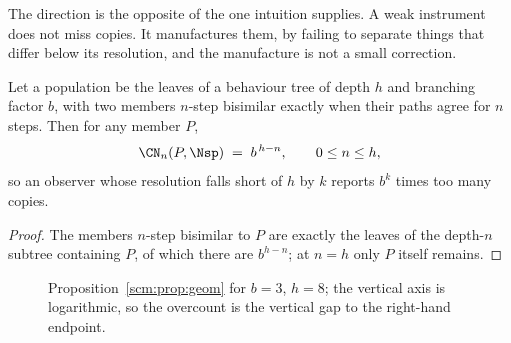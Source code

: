 The direction is the opposite of the one intuition supplies. A weak
instrument does not miss copies. It manufactures them, by failing to
separate things that differ below its resolution, and the manufacture is
not a small correction.

\begin{proposition}
\label{scm:prop:geom}
Let a population be the leaves of a behaviour tree of depth $h$ and
branching factor $b$, with two members $n$-step bisimilar exactly when
their paths agree for $n$ steps. Then for any member $P$,
\[
  \CN_n(P,\Nsp) \;=\; b^{\,h-n}, \qquad 0 \le n \le h,
\]
so an observer whose resolution falls short of $h$ by $k$ reports $b^{k}$
times too many copies.
\end{proposition}

\begin{proof}
The members $n$-step bisimilar to $P$ are exactly the leaves of the
depth-$n$ subtree containing $P$, of which there are $b^{h-n}$; at $n = h$
only $P$ itself remains.
\end{proof}

\begin{figure}[t]
\centering
{}
\caption{Proposition~\ref{scm:prop:geom} for $b=3$, $h=8$; the vertical
axis is logarithmic, so the overcount is the vertical gap to the
right-hand endpoint.}
\label{scm:fig:overcount}
\end{figure}


